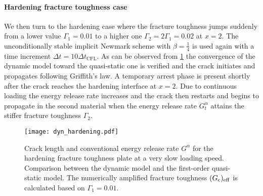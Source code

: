 \paragraph{Hardening fracture toughness case} We then turn to the hardening case where the fracture toughness jumps suddenly from a lower value $\Gamma_1=0.01$ to a higher one $\Gamma_2=2\Gamma_1=0.02$ at $x=2$. The unconditionally stable implicit Newmark scheme with $\beta=\frac{1}{4}$ is used again with a time increment $\Delta t=10\Delta t_\mathrm{CFL}$. As can be observed from \cref{fig:hardGcqs} the convergence of the dynamic model toward the quasi-static one is verified and the crack initiates and propagates following Griffith's law. A temporary arrest phase is present shortly after the crack reaches the hardening interface at $x=2$. Due to continuous loading the energy release rate increases and the crack then restarts and begins to propagate in the second material when the energy release rate $G^\alpha_t$ attains the stiffer fracture toughness $\Gamma_2$.
\begin{figure}[htbp]
\centering
\texttt{[image: dyn\_hardening.pdf]}
\caption{Crack length and conventional energy release rate $G^\alpha$ for the hardening fracture toughness plate at a very slow loading speed. Comparison between the dynamic model and the first-order quasi-static model. The numerically amplified fracture toughness $(G_\mathrm{c})_\mathrm{eff}$ is calculated based on $\Gamma_1=0.01$.} \label{fig:hardGcqs}
\end{figure}


